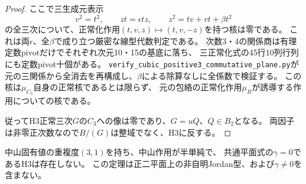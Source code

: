 \begin{proof}
ここで三生成元表示
\[
 v^2=t^2,\qquad zt=\epsilon tz,\qquad
 z^2=tv+vt+\beta t^2
\]
の全三次について、正常化作用$(t,v,z)\mapsto(t,v,-z)$を持つ核は零である。
これは両$\epsilon$、全$\beta$で成り立つ厳密な線型代数判定である。
次数3・4の関係商は有理定数pivotだけでそれぞれ次元10・15の基底に落ち、
三正常化式の45行10列行列にも定数pivot十個がある。
\texttt{verify\_cubic\_positive3\_commutative\_plane.py}が
元の三関係から全消去を再構成し、$\beta$による除算なしに全係数で検証する。
この核は$\mu_{C_3}$自身の正常核であるとは限らず、
元の包絡の正常化作用$\mu_B$が誘導する作用についての核である。

従ってH3正常三次$G$の$C_3$への像は零であり、$G=uQ$、$Q\in B_2$となる。
両因子は非零正次数なので$B/(G)$は整域でなく、H3に反する。
\end{proof}

\begin{theorem}[正三次元半単純・$\gamma=0$部分の全排除]
\label{thm:h3-positive3-semisimple-gamma-zero-exclusion}
中山固有値の重複度$(3,1)$を持ち、中山作用が半単純で、
共通平面式の$\gamma=0$であるH3は存在しない。
この定理は正二平面上の非自明Jordan型、および$\gamma\ne0$を含まない。
\end{theorem}
